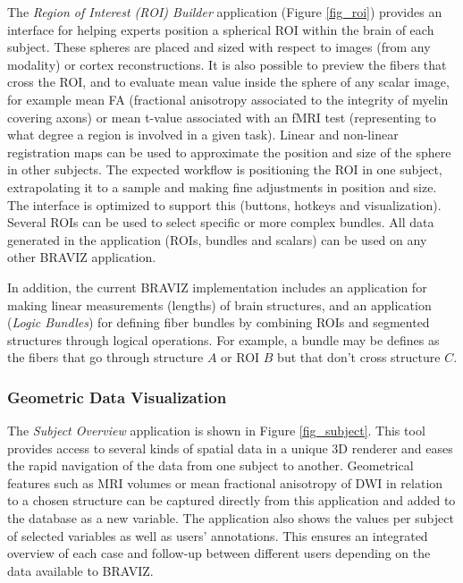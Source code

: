 \documentclass{frontiersHLTH}
\begin{document}
The \emph{Region of Interest (ROI) Builder} application (Figure \ref{fig_roi}) provides an interface for helping experts position a spherical ROI within the brain of each subject. These spheres are placed and sized with respect to images (from any modality) or cortex reconstructions. It is also possible to preview the fibers that cross the ROI, and to evaluate mean value inside the sphere of any scalar image, for example mean FA (fractional anisotropy associated to the integrity of myelin covering axons) or mean t-value associated with an fMRI test (representing to what degree a region is involved in a given task). 
Linear and non-linear registration maps can be used to approximate the position and size of the sphere in other subjects. The expected workflow is positioning the ROI in one subject, extrapolating it to a sample and making fine adjustments in position and size. The interface is optimized to support this (buttons, hotkeys and visualization). Several ROIs can be used to select specific or more complex bundles. All data generated in the application (ROIs, bundles and scalars) can be used on any other BRAVIZ application. 

In addition, the current BRAVIZ implementation includes an application for making linear measurements (lengths) of brain structures, and an application (\emph{Logic Bundles}) for defining fiber bundles by combining ROIs and segmented structures through logical operations. For example, a bundle may be defines as the fibers that go through structure $A$ or ROI $B$ but that don't cross structure $C$. 


\subsubsection{Geometric Data Visualization}

The \emph{Subject Overview} application is shown in Figure \ref{fig_subject}. This tool  provides access to several kinds of spatial data in a unique 3D renderer and eases the rapid navigation of the data from one subject to another. Geometrical features such as MRI volumes or mean fractional anisotropy of DWI in relation to a chosen structure can be captured directly from this application and added to the database as a new variable. The application also shows the values per subject of selected variables as well as users' annotations. This ensures an integrated overview of each case and follow-up between different users depending on the data available to BRAVIZ.
\end{document}
